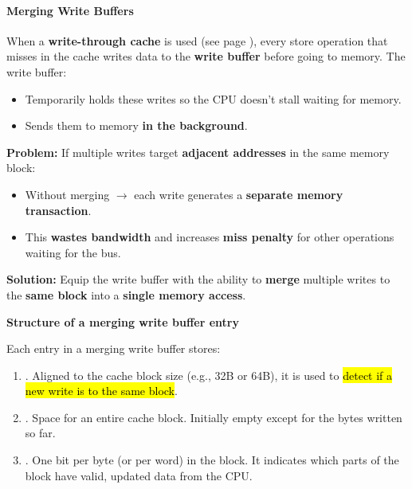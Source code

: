 \paragraph{Merging Write Buffers}\label{paragraph: Merging Write Buffers}

When a \textbf{write-through cache} is used (see page ), every store operation that misses in the cache writes data to the \textbf{write buffer} before going to memory. The write buffer:
\begin{itemize}
    \item Temporarily holds these writes so the CPU doesn't stall waiting for memory.
    \item Sends them to memory \textbf{in the background}.
\end{itemize}
\textcolor{Red2}{ \textbf{Problem:}} If multiple writes target \textbf{adjacent addresses} in the same memory block:
\begin{itemize}
    \item Without merging $\rightarrow$ each write generates a \textbf{separate memory transaction}.
    \item This \textbf{wastes bandwidth} and increases \textbf{miss penalty} for other operations waiting for the bus.
\end{itemize}
\textcolor{Green3}{ \textbf{Solution:}} Equip the write buffer with the ability to \textbf{merge} multiple writes to the \textbf{same block} into a \textbf{single memory access}.

\highspace
\begin{flushleft}
    \textcolor{Green3}{ \textbf{Structure of a merging write buffer entry}}
\end{flushleft}
Each entry in a merging write buffer stores:
\begin{enumerate}
    \item {}. Aligned to the cache block size (e.g., 32B or 64B), it is used to \hl{detect if a new write is to the same block}.
    \item {}. Space for an entire cache block. Initially empty except for the bytes written so far.
    \item {}. One bit per byte (or per word) in the block. It indicates which parts of the block have valid, updated data from the CPU.
\end{enumerate}

